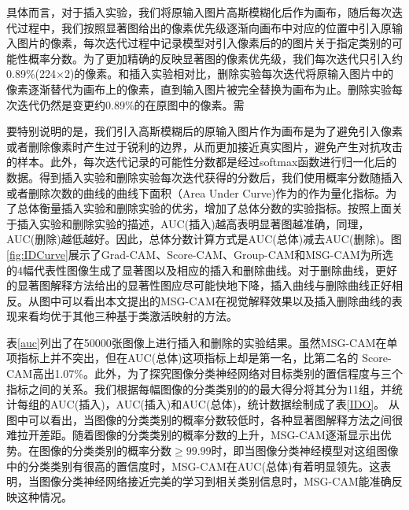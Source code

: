 具体而言，对于插入实验，我们将原输入图片高斯模糊化后作为画布，随后每次迭代过程中，我们按照显著图给出的像素优先级逐渐向画布中对应的位置中引入原输入图片的像素，每次迭代过程中记录模型对引入像素后的的图片关于指定类别的可能性概率分数。为了更加精确的反映显著图的像素优先级，我们每次迭代只引入约0.89\%(224$\times$2)的像素。和插入实验相对比，删除实验每次迭代将原输入图片中的像素逐渐替代为画布上的像素，直到输入图片被完全替换为画布为止。删除实验每次迭代仍然是变更约0.89\%的在原图中的像素。需

要特别说明的是，我们引入高斯模糊后的原输入图片作为画布是为了避免引入像素或者删除像素时产生过于锐利的边界，从而更加接近真实图片，避免产生对抗攻击的样本。此外，每次迭代记录的可能性分数都是经过softmax函数进行归一化后的数据。得到插入实验和删除实验每次迭代获得的分数后，我们使用概率分数随插入或者删除次数的曲线的曲线下面积（Area Under Curve)作为的作为量化指标。为了总体衡量插入实验和删除实验的优劣，增加了总体分数的实验指标。按照上面关于插入实验和删除实验的描述，AUC(插入)越高表明显著图越准确，同理，AUC(删除)越低越好。因此，总体分数计算方式是AUC(总体)减去AUC(删除)。图\ref{fig:IDCurve}展示了Grad-CAM、Score-CAM、Group-CAM和MSG-CAM为所选的4幅代表性图像生成了显著图以及相应的插入和删除曲线。对于删除曲线，更好的显著图解释方法给出的显著性图应尽可能快地下降，插入曲线与删除曲线正好相反。从图中可以看出本文提出的MSG-CAM在视觉解释效果以及插入删除曲线的表现来看均优于其他三种基于类激活映射的方法。


表\ref{auc}列出了在50000张图像上进行插入和删除的实验结果。虽然MSG-CAM在单项指标上并不突出，但在AUC(总体)这项指标上却是第一名，比第二名的 Score-CAM高出1.07\%。此外，为了探究图像分类神经网络对目标类别的置信程度与三个指标之间的关系。我们根据每幅图像的分类类别的的最大得分将其分为11组，并统计每组的AUC(插入)，AUC(插入)和AUC(总体)，统计数据绘制成了表\ref{IDO}。 从图中可以看出，当图像的分类类别的概率分数较低时，各种显著图解释方法之间很难拉开差距。随着图像的分类类别的概率分数的上升，MSG-CAM逐渐显示出优势。在图像的分类类别的概率分数$\geq 99.99$时，即当图像分类神经模型对这组图像中的分类类别有很高的置信度时，MSG-CAM在AUC(总体)有着明显领先。这表明，当图像分类神经网络接近完美的学习到相关类别信息时，MSG-CAM能准确反映这种情况。



